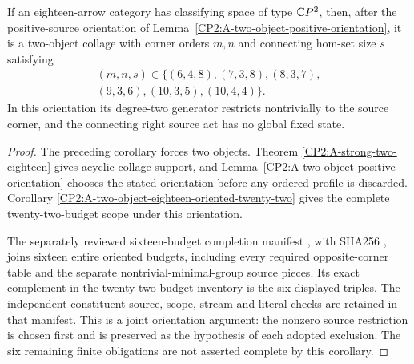 \begin{corollary}
\label{CP2:A-eighteen-six-two-object-budgets}
If an eighteen-arrow category has classifying space
of type $\mathbb{C}P^2$, then, after the positive-source
orientation of Lemma~\ref{CP2:A-two-object-positive-orientation},
it is a two-object collage with corner orders $m,n$
and connecting hom-set size $s$ satisfying
\[
\begin{gathered}
 (m,n,s)\in\{(6,4,8),(7,3,8),(8,3,7),\\
             (9,3,6),(10,3,5),(10,4,4)\}.
\end{gathered}
\]
In this orientation its degree-two generator restricts
nontrivially to the source corner, and the connecting
right source act has no global fixed state.
\end{corollary}
\begin{proof}
The preceding corollary forces two objects.  Theorem
\ref{CP2:A-strong-two-eighteen} gives acyclic collage support, and
Lemma~\ref{CP2:A-two-object-positive-orientation} chooses
the stated orientation before any ordered profile is
discarded.  Corollary
\ref{CP2:A-two-object-eighteen-oriented-twenty-two}
gives the complete twenty-two-budget scope under this
orientation.

The separately reviewed sixteen-budget completion
manifest
,
with SHA256
,
joins sixteen entire oriented budgets, including every
required opposite-corner table and the separate
nontrivial-minimal-group source pieces.  Its exact
complement in the twenty-two-budget inventory is the
six displayed triples.  The independent constituent
source, scope, stream and literal checks are retained
in that manifest.  This is a joint orientation
argument: the nonzero source restriction is chosen
first and is preserved as the hypothesis of each
adopted exclusion.  The six remaining finite obligations
are not asserted complete by this corollary.
\end{proof}
